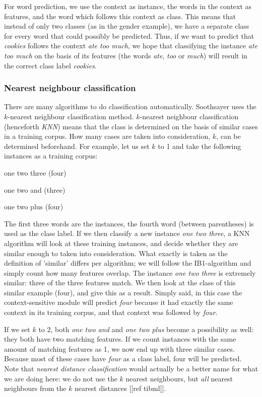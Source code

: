 \documentclass[12pt]{article}
\begin{document}
For word prediction, we use the context as instance, the words in the context as features, and the word which follows this context as class. This means that instead of only two classes (as in the gender example), we have a separate class for every word that could possibly be predicted. Thus, if we want to predict that \emph{cookies} follows the context \emph{ate too much}, we hope that classifying the instance \emph{ate too much} on the basis of its features (the words \emph{ate}, \emph{too} or \emph{much}) will result in the correct class label \emph{cookies}.

\subsubsection{Nearest neighbour classification}

There are many algorithms to do classification automatically. Soothsayer uses the $k$-nearest neighbour classification method. $k$-nearest neighbour classification (henceforth \emph{KNN}) means that the class is determined on the basis of similar cases in a training corpus. How many cases are taken into consideration, $k$, can be determined beforehand. For example, let us set $k$ to 1 and take the following instances as a training corpus:

\begin{examples}
\item one two three (four)
\item one two and (three)
\item one two plus (four)
\end{examples}

The first three words are the instances, the fourth word (between parentheses) is used as the class label. If we then classify a new instance \emph{one two three}, a KNN algorithm will look at these training instances, and decide whether they are similar enough to taken into consideration. What exactly is taken as the definition of 'similar' differs per algorithm; we will follow the IB1-algorithm \cite{aha+91} and simply count how many features overlap. The instance \emph{one two three} is extremely similar: three of the three features match. We then look at the class of this similar example (four), and give this as a result. Simply said, in this case the context-sensitive module will predict \emph{four} because it had exactly the same context in its training corpus, and that context was followed by \emph{four}.

If we set $k$ to 2, both \emph{one two and} and \emph{one two plus} become a possibility as well: they both have two matching features. If we count instances with the same amount of matching features as 1, we now end up with three similar cases. Because most of these cases have \emph{four} as a class label, four will be predicted. Note that \emph{nearest distance classification} would actually be a better name for what we are doing here: we do not use the $k$ nearest neighbours, but \emph{all} nearest neighbours from the $k$ nearest distances [[ref tibml]].
\end{document}
